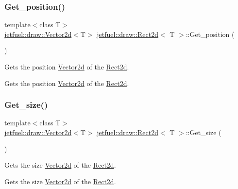 \subsubsection{\texorpdfstring{Get\+\_\+position()}{Get\_position()}}
{\footnotesize\ttfamily template$<$class T$>$ \\
\hyperlink{classjetfuel_1_1draw_1_1Vector2d}{jetfuel\+::draw\+::\+Vector2d}$<$T$>$ \hyperlink{classjetfuel_1_1draw_1_1Rect2d}{jetfuel\+::draw\+::\+Rect2d}$<$ T $>$\+::Get\+\_\+position (\begin{DoxyParamCaption}{ }\end{DoxyParamCaption})\hspace{0.3cm}{\ttfamily [inline]}}



Gets the position \hyperlink{classjetfuel_1_1draw_1_1Vector2d}{Vector2d} of the \hyperlink{classjetfuel_1_1draw_1_1Rect2d}{Rect2d}. 

Gets the position \hyperlink{classjetfuel_1_1draw_1_1Vector2d}{Vector2d} of the \hyperlink{classjetfuel_1_1draw_1_1Rect2d}{Rect2d}. \mbox{\label{classjetfuel_1_1draw_1_1Rect2d_a3e14b3f59200c452a08085c724950afb}} 
\subsubsection{\texorpdfstring{Get\+\_\+size()}{Get\_size()}}
{\footnotesize\ttfamily template$<$class T$>$ \\
\hyperlink{classjetfuel_1_1draw_1_1Vector2d}{jetfuel\+::draw\+::\+Vector2d}$<$T$>$ \hyperlink{classjetfuel_1_1draw_1_1Rect2d}{jetfuel\+::draw\+::\+Rect2d}$<$ T $>$\+::Get\+\_\+size (\begin{DoxyParamCaption}{ }\end{DoxyParamCaption})\hspace{0.3cm}{\ttfamily [inline]}}



Gets the size \hyperlink{classjetfuel_1_1draw_1_1Vector2d}{Vector2d} of the \hyperlink{classjetfuel_1_1draw_1_1Rect2d}{Rect2d}. 

Gets the size \hyperlink{classjetfuel_1_1draw_1_1Vector2d}{Vector2d} of the \hyperlink{classjetfuel_1_1draw_1_1Rect2d}{Rect2d}. \mbox{\label{classjetfuel_1_1draw_1_1Rect2d_ae29d8f3e8a6f522d6aacdd00b8d3f757}} 
